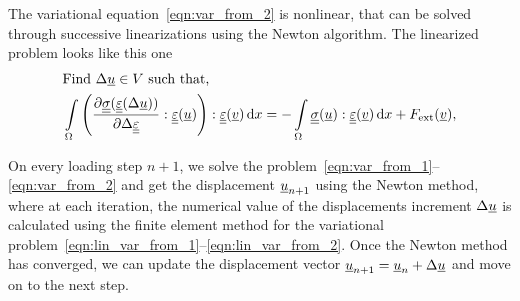 \documentclass[12pt]{article}
\newcommand{\todounderline}[1]{\todo[inline, size=\scriptsize]{#1}}
\begin{document}
The variational equation~\eqref{eqn:var_from_2} is nonlinear, that can be solved through successive linearizations using the
Newton algorithm. The linearized problem looks like this one
\begin{align}
    & \text{Find } \Delta\underline{u} \in V \text{ such that,} \label{eqn:lin_var_from_1} \\ 
    & \int\limits_\Omega \left(\frac{\partial\underline{\underline{\sigma}}(\underline{\underline{\varepsilon}}(\Delta\underline{u}))}{\partial\Delta\underline{\underline{\varepsilon}}} : \underline{\underline{\varepsilon}}(\underline{u})\right) : \underline{\underline{\varepsilon}}(\underline{v}) \, \mathrm{d} x = -\int\limits_\Omega\underline{\underline{\sigma}}(\underline{u}) : \underline{\underline{\varepsilon}}(\underline{v}) \, \mathrm{d} x + F_\text{ext}(\underline{v}) \label{eqn:lin_var_from_2},
\end{align}

On every loading step $n+1$, we solve the problem~\eqref{eqn:var_from_1}--\eqref{eqn:var_from_2} and get the displacement $\underline{u}_{n+1}$ using the Newton method, where at each iteration, the numerical value of the displacements increment $\Delta\underline{u}$ is calculated using the finite element method for the variational problem~\eqref{eqn:lin_var_from_1}--\eqref{eqn:lin_var_from_2}. Once the Newton method has converged, we can update the displacement vector $\underline{u}_{n+1} = \underline{u}_n + \Delta\underline{u}$ and move on to the next step. 
\end{document}
